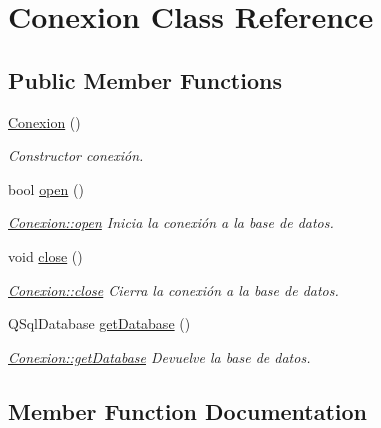 \hypertarget{classConexion}{}\section{Conexion Class Reference}
\label{classConexion}
\subsection*{Public Member Functions}
\begin{DoxyCompactItemize}
\item 
\mbox{\label{classConexion_aba0281e06667725e147fa891e8a82fb3}} 
\mbox{\hyperlink{classConexion_aba0281e06667725e147fa891e8a82fb3}{Conexion}} ()
\begin{DoxyCompactList}\small\item\em Constructor conexión. \end{DoxyCompactList}\item 
bool \mbox{\hyperlink{classConexion_af697de4217c41446258b49844b4d85c1}{open}} ()
\begin{DoxyCompactList}\small\item\em \mbox{\hyperlink{classConexion_af697de4217c41446258b49844b4d85c1}{Conexion\+::open}} Inicia la conexión a la base de datos. \end{DoxyCompactList}\item 
\mbox{\label{classConexion_ac83336bc48ea39ae47c2e8b0b10fba64}} 
void \mbox{\hyperlink{classConexion_ac83336bc48ea39ae47c2e8b0b10fba64}{close}} ()
\begin{DoxyCompactList}\small\item\em \mbox{\hyperlink{classConexion_ac83336bc48ea39ae47c2e8b0b10fba64}{Conexion\+::close}} Cierra la conexión a la base de datos. \end{DoxyCompactList}\item 
Q\+Sql\+Database \mbox{\hyperlink{classConexion_adf8045b7fd9daf7a47528d1c32eda4d2}{get\+Database}} ()
\begin{DoxyCompactList}\small\item\em \mbox{\hyperlink{classConexion_adf8045b7fd9daf7a47528d1c32eda4d2}{Conexion\+::get\+Database}} Devuelve la base de datos. \end{DoxyCompactList}\end{DoxyCompactItemize}


\subsection{Member Function Documentation}
\mbox{\label{classConexion_adf8045b7fd9daf7a47528d1c32eda4d2}} 
